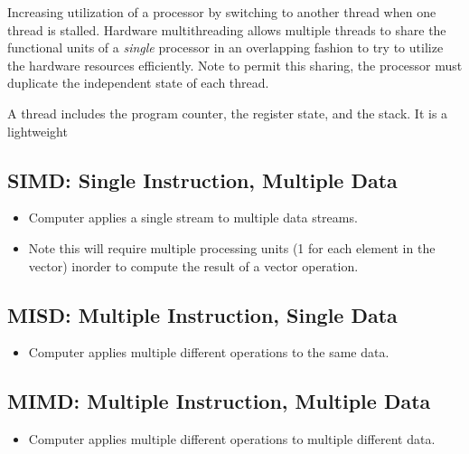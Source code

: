 \documentclass[12pt]{article}
\begin{document}
\begin{definition}
    Increasing utilization of a processor by switching to another thread when one thread is stalled. Hardware multithreading allows multiple threads to share the functional units of a \emph{single} processor in an overlapping fashion to try to utilize the hardware resources efficiently. Note to permit this sharing, the processor must duplicate the independent state of each thread.
\end{definition}

\begin{definition}[Thread]
    A thread includes the program counter, the register state, and the stack. It is a lightweight
\end{definition}

\subsection*{SIMD: Single Instruction, Multiple Data}
\begin{itemize}
    \item Computer applies a single stream to multiple data streams.
    \item Note this will require multiple processing units (1 for each element in the vector) inorder to compute the result of a vector operation.
\end{itemize}

\subsection*{MISD: Multiple Instruction, Single Data}
\begin{itemize}
    \item Computer applies multiple different operations to the same data.
\end{itemize}

\subsection*{MIMD: Multiple Instruction, Multiple Data}
\begin{itemize}
    \item Computer applies multiple different operations to multiple different data.
\end{itemize}
\end{document}
